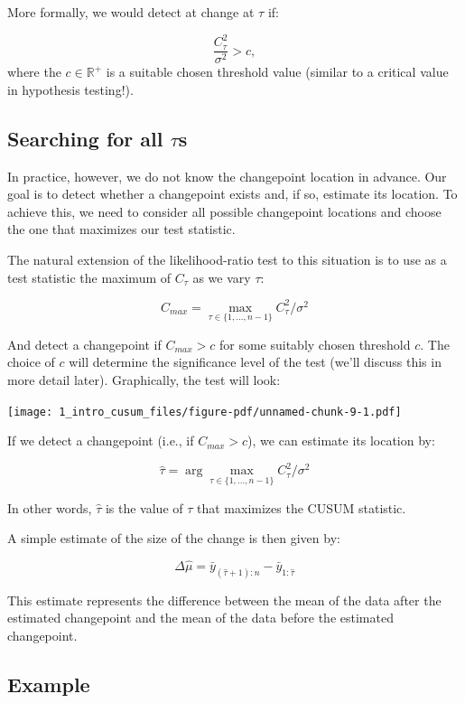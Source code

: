 \documentclass[
  letterpaper,
  DIV=11,
  numbers=noendperiod]{scrreprt}
\begin{document}
More formally, we would detect at change at \(\tau\) if:

\[
\frac{C_{\tau}^2 }{\sigma^2} > c,
\] where the \(c \in \mathbb{R}^+\) is a suitable chosen threshold value
(similar to a critical value in hypothesis testing!).

\subsection{\texorpdfstring{Searching for all
\(\tau\)s}{Searching for all \textbackslash taus}}\label{searching-for-all-taus}

In practice, however, we do not know the changepoint location in
advance. Our goal is to detect whether a changepoint exists and, if so,
estimate its location. To achieve this, we need to consider all possible
changepoint locations and choose the one that maximizes our test
statistic.

The natural extension of the likelihood-ratio test to this situation is
to use as a test statistic the maximum of \(C_\tau\) as we vary
\(\tau\):

\[
C_{max} = \max_{\tau \in \{1,\ldots,n-1\}} C_\tau^2 / \sigma^2
\]

And detect a changepoint if \(C_{max} > c\) for some suitably chosen
threshold \(c\). The choice of \(c\) will determine the significance
level of the test (we'll discuss this in more detail later).
Graphically, the test will look:

\texttt{[image: 1\_intro\_cusum\_files/figure-pdf/unnamed-chunk-9-1.pdf]}

If we detect a changepoint (i.e., if \(C_{max} > c\)), we can estimate
its location by:

\[
\hat{\tau} = \arg\max_{\tau \in \{1,\ldots,n-1\}}  C_\tau^2 / \sigma^2
\]

In other words, \(\hat{\tau}\) is the value of \(\tau\) that maximizes
the CUSUM statistic.

A simple estimate of the size of the change is then given by:

\[
\Delta\hat{\mu} = \bar{y}_{(\hat{\tau}+1):n} - \bar{y}_{1:\hat{\tau}}
\]

This estimate represents the difference between the mean of the data
after the estimated changepoint and the mean of the data before the
estimated changepoint.

\subsection{Example}\label{example}
\end{document}
